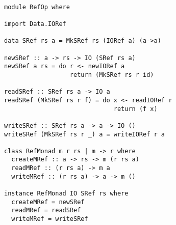 \begin{Verbatim}[fontsize=\footnotesize,frame=lines,
                 framesep=5mm, label={[RefOp.hs]RefOp.hs}]

module RefOp where

import Data.IORef

data SRef rs a = MkSRef rs (IORef a) (a->a)

newSRef :: a -> rs -> IO (SRef rs a)
newSRef a rs = do r <- newIORef a
                  return (MkSRef rs r id)

readSRef :: SRef rs a -> IO a
readSRef (MkSRef rs r f) = do x <- readIORef r
                              return (f x)

writeSRef :: SRef rs a -> a -> IO ()
writeSRef (MkSRef rs r _) a = writeIORef r a

class RefMonad m r rs | m -> r where
  createMRef :: a -> rs -> m (r rs a) 
  readMRef :: (r rs a) -> m a
  writeMRef :: (r rs a) -> a -> m ()

instance RefMonad IO SRef rs where
  createMRef = newSRef
  readMRef = readSRef
  writeMRef = writeSRef

\end{Verbatim}

